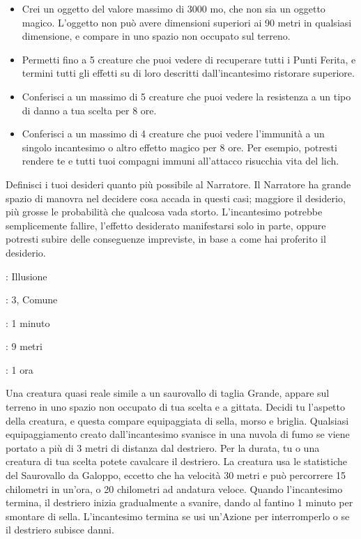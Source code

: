 \begin{multicols}{2}
\begin{itemize}[leftmargin=*] \setlength{\itemsep}{0pt}
	\item Crei un oggetto del valore massimo di 3000 mo, che non sia un oggetto magico. L'oggetto non può avere dimensioni superiori ai 90 metri in qualsiasi dimensione, e compare in uno spazio non occupato sul terreno.
	\item Permetti fino a 5 creature che puoi vedere di recuperare tutti i Punti Ferita, e termini tutti gli effetti su di loro descritti dall'incantesimo ristorare superiore.
	\item Conferisci a un massimo di 5 creature che puoi vedere la resistenza a un tipo di danno a tua scelta per 8 ore.
	\item Conferisci a un massimo di 4 creature che puoi vedere l'immunità a un singolo incantesimo o altro effetto magico per 8 ore. Per esempio, potresti rendere te e tutti tuoi compagni immuni all'attacco risucchia vita del lich.
\end{itemize}

\medskip
Definisci i tuoi desideri quanto più possibile al Narratore. Il Narratore ha grande spazio di manovra nel decidere cosa accada in questi casi; maggiore il desiderio, più grosse le probabilità che qualcosa vada storto. L'incantesimo potrebbe semplicemente fallire, l'effetto desiderato manifestarsi solo in parte, oppure potresti subire delle conseguenze impreviste, in base a come hai proferito il desiderio.


\noindent\colorbox{OBSSgold!10}{
\begin{minipage}{0.95\linewidth}
\begin{description}[noitemsep, topsep=0pt, parsep=0pt, partopsep=0pt, leftmargin=0cm, labelwidth=1.3cm]
	\item[\textbf{Lista}]: Illusione
	\item[\textbf{Livello}]: 3, Comune
	\item[\textbf{Lancio}]: 1 minuto
	\item[\textbf{Gittata}]: 9 metri
	\item[\textbf{Durata}]: 1 ora
\end{description}
\end{minipage}}\smallskip

Una creatura quasi reale simile a un saurovallo di taglia Grande, appare sul terreno in uno spazio non occupato di tua scelta e a gittata. Decidi tu l'aspetto della creatura, e questa compare equipaggiata di sella, morso e briglia. Qualsiasi equipaggiamento creato dall'incantesimo svanisce in una nuvola di fumo se viene portato a più di 3 metri di distanza dal destriero. Per la durata, tu o una creatura di tua scelta potete cavalcare il destriero. La creatura usa le statistiche del Saurovallo da Galoppo, eccetto che ha velocità 30 metri e può percorrere 15 chilometri in un'ora, o 20 chilometri ad andatura veloce. Quando l'incantesimo termina, il destriero inizia gradualmente a svanire, dando al fantino 1 minuto per smontare di sella. L'incantesimo termina se usi un'Azione per interromperlo o se il destriero subisce danni.


\end{multicols}
